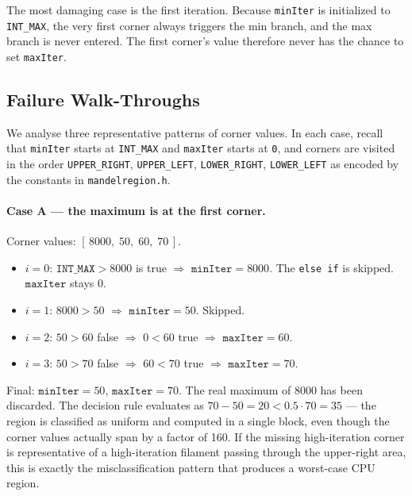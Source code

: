 \documentclass[
	english,
	letterpaper, oneside
]{article}
\begin{document}
The most damaging case is the first iteration. Because \texttt{minIter}
is initialized to \texttt{INT\_MAX}, the very first corner always
triggers the min branch, and the max branch is never entered. The first
corner's value therefore never has the chance to set \texttt{maxIter}.

\subsection{Failure Walk-Throughs}

We analyse three representative patterns of corner values. In each case,
recall that \texttt{minIter} starts at \texttt{INT\_MAX} and
\texttt{maxIter} starts at \texttt{0}, and corners are visited in the
order \texttt{UPPER\_RIGHT}, \texttt{UPPER\_LEFT}, \texttt{LOWER\_RIGHT},
\texttt{LOWER\_LEFT} as encoded by the constants in
\texttt{mandelregion.h}.

\paragraph{Case A — the maximum is at the first corner.}
Corner values: $[\,8000,\;50,\;60,\;70\,]$.

\begin{itemize}
    \item $i=0$: $\texttt{INT\_MAX} > 8000$ is true $\Rightarrow$
          $\texttt{minIter} = 8000$. The \texttt{else if} is skipped.
          $\texttt{maxIter}$ stays $0$.
    \item $i=1$: $8000 > 50$ $\Rightarrow$ $\texttt{minIter} = 50$.
          Skipped.
    \item $i=2$: $50 > 60$ false $\Rightarrow$ $0 < 60$ true
          $\Rightarrow$ $\texttt{maxIter} = 60$.
    \item $i=3$: $50 > 70$ false $\Rightarrow$ $60 < 70$ true
          $\Rightarrow$ $\texttt{maxIter} = 70$.
\end{itemize}

\noindent
Final: $\texttt{minIter} = 50$, $\texttt{maxIter} = 70$. The real maximum
of $8000$ has been discarded. The decision rule evaluates as
$70 - 50 = 20 < 0.5 \cdot 70 = 35$ — the region is classified as
uniform and computed in a single block, even though the corner values
actually span by a factor of 160. If the missing high-iteration corner
is representative of a high-iteration filament passing through the
upper-right area, this is exactly the misclassification pattern that
produces a worst-case CPU region.
\end{document}
